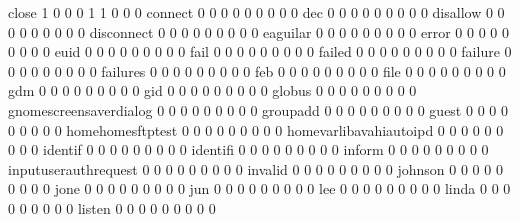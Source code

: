\documentclass[compress,8pt]{beamer}
\begin{document}
\begin{frame}
\begin{Schunk}
  close                                      1   0   0   0   1   1   0   0   0
  connect                                    0   0   0   0   0   0   0   0   0
  dec                                        0   0   0   0   0   0   0   0   0
  disallow                                   0   0   0   0   0   0   0   0   0
  disconnect                                 0   0   0   0   0   0   0   0   0
  eaguilar                                   0   0   0   0   0   0   0   0   0
  error                                      0   0   0   0   0   0   0   0   0
  euid                                       0   0   0   0   0   0   0   0   0
  fail                                       0   0   0   0   0   0   0   0   0
  failed                                     0   0   0   0   0   0   0   0   0
  failure                                    0   0   0   0   0   0   0   0   0
  failures                                   0   0   0   0   0   0   0   0   0
  feb                                        0   0   0   0   0   0   0   0   0
  file                                       0   0   0   0   0   0   0   0   0
  gdm                                        0   0   0   0   0   0   0   0   0
  gid                                        0   0   0   0   0   0   0   0   0
  globus                                     0   0   0   0   0   0   0   0   0
  gnomescreensaverdialog                     0   0   0   0   0   0   0   0   0
  groupadd                                   0   0   0   0   0   0   0   0   0
  guest                                      0   0   0   0   0   0   0   0   0
  homehomesftptest                           0   0   0   0   0   0   0   0   0
  homevarlibavahiautoipd                     0   0   0   0   0   0   0   0   0
  identif                                    0   0   0   0   0   0   0   0   0
  identifi                                   0   0   0   0   0   0   0   0   0
  inform                                     0   0   0   0   0   0   0   0   0
  inputuserauthrequest                       0   0   0   0   0   0   0   0   0
  invalid                                    0   0   0   0   0   0   0   0   0
  johnson                                    0   0   0   0   0   0   0   0   0
  jone                                       0   0   0   0   0   0   0   0   0
  jun                                        0   0   0   0   0   0   0   0   0
  lee                                        0   0   0   0   0   0   0   0   0
  linda                                      0   0   0   0   0   0   0   0   0
  listen                                     0   0   0   0   0   0   0   0   0

\end{Schunk}
\end{frame}
\end{document}
